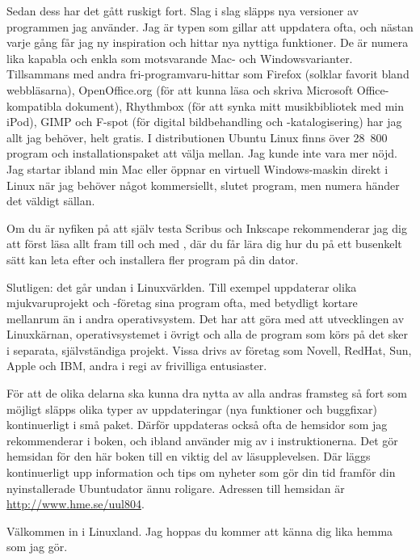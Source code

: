 \documentclass[a4paper,final]{memoir} %
\newcommand\xshortname{uul804}
\newcommand\xurl{http://www.hme.se/}
\newcommand\xpackagecount{28~800} %
\begin{document}
Sedan dess har det gått ruskigt fort. Slag i slag släpps nya versioner av programmen jag använder. Jag är typen som gillar att uppdatera ofta, och nästan varje gång får jag ny inspiration och hittar nya nyttiga funktioner. De är numera lika kapabla och enkla som motsvarande Mac- och Windowsvarianter. Tillsammans med andra fri-programvaru-hittar som Firefox (solklar favorit bland webbläsarna), OpenOffice.org (för att kunna läsa och skriva Microsoft Office-kompatibla dokument), Rhythmbox (för att synka mitt musikbibliotek med min iPod), GIMP och F-spot (för digital bildbehandling och -katalogisering) har jag allt jag behöver, helt gratis. I distributionen Ubuntu Linux finns över \xpackagecount{} program och installationspaket att välja mellan. Jag kunde inte vara mer nöjd. Jag startar ibland min Mac eller öppnar en virtuell Windows-maskin direkt i Linux när jag behöver något kommersiellt, slutet program, men numera händer det väldigt sällan.

Om du är nyfiken på att själv testa Scribus och Inkscape rekommenderar jag dig att först läsa allt fram till och med , där du får lära dig hur du på ett busenkelt sätt kan leta efter och installera fler program på din dator.

Slutligen: det går undan i Linuxvärlden. Till exempel uppdaterar olika mjukvaruprojekt och -företag sina program ofta, med betydligt kortare mellanrum än i andra operativsystem. Det har att göra med att utvecklingen av Linuxkärnan, operativsystemet i övrigt och alla de program som körs på det sker i separata, självständiga projekt. Vissa drivs av företag som Novell, RedHat, Sun, Apple och IBM, andra i regi av frivilliga entusiaster. 

För att de olika delarna ska kunna dra nytta av alla andras framsteg så fort som möjligt släpps olika typer av uppdateringar (nya funktioner och buggfixar) kontinuerligt i små paket. Därför uppdateras också ofta de hemsidor som jag rekommenderar i boken, och ibland använder mig av i instruktionerna. Det gör hemsidan för den här boken till en viktig del av läsupplevelsen. Där läggs kontinuerligt upp information och tips om nyheter som gör din tid framför din nyinstallerade Ubuntudator ännu roligare. Adressen till hemsidan är \url{\xurl\xshortname}.

Välkommen in i Linuxland. Jag hoppas du kommer att känna dig lika hemma som jag gör.

\newpage

\end{document}
